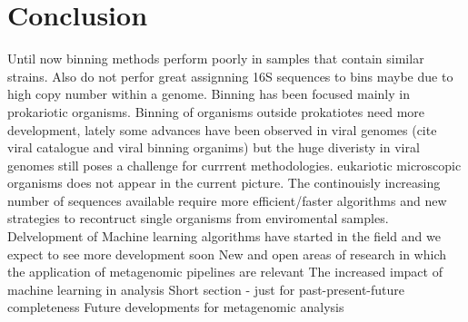 \documentclass{article}
\begin{document}
\section{Conclusion}
Until now binning methods perform poorly in samples that contain similar strains. Also do not perfor great assignning 16S sequences to bins maybe due to high copy number within a genome.
Binning has been focused mainly in prokariotic organisms. Binning of organisms outside prokatiotes need more development, lately some advances have been observed in viral genomes  (cite viral catalogue and viral binning organims) but the huge diveristy in viral genomes still poses a challenge for currrent methodologies. eukariotic microscopic organisms does not appear in the current picture. 
The continouisly increasing number of sequences available require more efficient/faster algorithms and new strategies to recontruct single organisms from enviromental samples.
Delvelopment of Machine learning algorithms have started in the field and we expect to see more development soon
New and open areas of research in which the application of metagenomic pipelines are relevant
The increased impact of machine learning in analysis
Short section - just for past-present-future completeness
Future developments for metagenomic analysis


\end{document}
